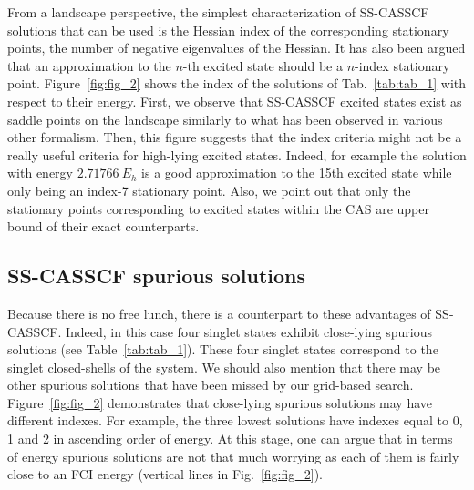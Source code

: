 \documentclass[aip,jcp,reprint,noshowkeys,superscriptaddress]{revtex4-1}
\begin{document}
From a landscape perspective, the simplest characterization of SS-CASSCF solutions that can be used is the Hessian index of the corresponding stationary points, \ie the number of negative eigenvalues of the Hessian.
It has also been argued that an approximation to the $n$-th excited state should be a $n$-index stationary point. \cite{Olsen_1983,Olsen_1982}
Figure~\ref{fig:fig_2} shows the index of the solutions of Tab.~\ref{tab:tab_1} with respect to their energy.
First, we observe that SS-CASSCF excited states exist as saddle points on the landscape similarly to what has been observed in various other formalism. \cite{Gilbert_2008,Hait_2021,Kossoski_2021}
Then, this figure suggests that the index criteria might not be a really useful criteria for high-lying excited states.
Indeed, for example the solution with energy $2.71766~E_h$ is a good approximation to the 15th excited state while only being an index-7 stationary point.
Also, we point out that only the stationary points corresponding to excited states within the CAS are upper bound of their exact counterparts. \cite{Helgaker_2000,Mahler_2021}

\subsection{SS-CASSCF spurious solutions}
\label{sec:spurious}

Because there is no free lunch, there is a counterpart to these advantages of SS-CASSCF.
Indeed, in this case four singlet states exhibit close-lying spurious solutions (see Table~\ref{tab:tab_1}).
These four singlet states correspond to the singlet closed-shells of the system.
We should also mention that there may be other spurious solutions that have been missed by our grid-based search.
Figure~\ref{fig:fig_2} demonstrates that close-lying spurious solutions may have different indexes.
For example, the three lowest solutions have indexes equal to 0, 1 and 2 in ascending order of energy.
At this stage, one can argue that in terms of energy spurious solutions are not that much worrying as each of them is fairly close to an FCI energy (vertical lines in  Fig.~\ref{fig:fig_2}).
\end{document}
